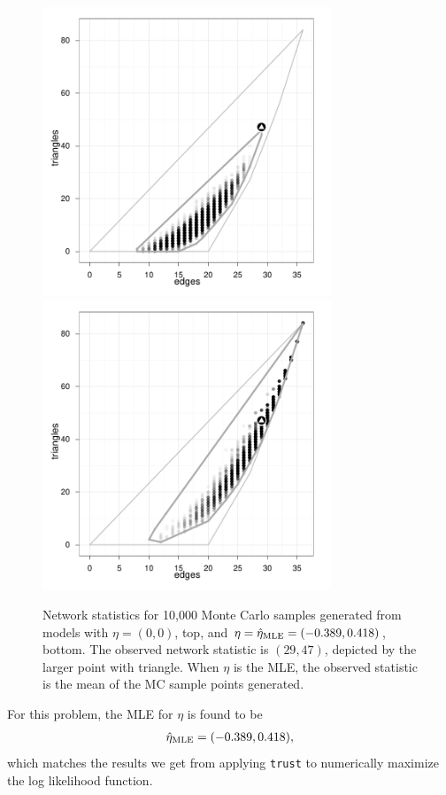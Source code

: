 \begin{figure}[h!]
\centering
\includegraphics[width=3.4in]{Figures/MCsample-far-BW}
\includegraphics[width=3.4in]{Figures/MCsample-MLE-BW}
\caption[Network statistics for 10,000 Monte Carlo samples when MLE exists]
{Network statistics for 10,000 Monte Carlo samples generated from models 
with $\eta= (0,0)$, top, and $\eta = \hat{\eta}_{\textrm{MLE}} = (-0.389, 0.418)$,
bottom.  The observed network statistic is $(29,47)$, depicted by the 
larger point with triangle.  When $\eta$ is the MLE, the observed statistic is 
the mean of the MC sample points generated. }
\label{F:MC cloud}
\end{figure}
For this problem, the MLE for $\eta$ is found to be
\begin{align*}
\hat{\eta}_{\textrm{MLE}} = (-0.389, 0.418),
\end{align*}
which matches the results we get from applying \texttt{trust} to numerically
maximize the log likelihood function.

